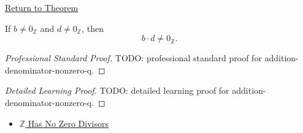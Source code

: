 \newpage
{}
\label{prf:addition-denominator-nonzero-q}

\begin{remark*}[Return]
\hyperref[lem:addition-denominator-nonzero-q]{Return to Theorem}
\end{remark*}

\begin{lemma*}
If $b\ne 0_{\mathbb{Z}}$ and $d\ne 0_{\mathbb{Z}}$, then
\[
b\cdot d\ne 0_{\mathbb{Z}}.
\]
\end{lemma*}

\begin{proof}[Professional Standard Proof]
\LRAProofBodyStart
TODO: professional standard proof for addition-denominator-nonzero-q.
\end{proof}

\begin{proof}[Detailed Learning Proof]
\LRAProofBodyStart
TODO: detailed learning proof for addition-denominator-nonzero-q.
\end{proof}

\begin{remark*}
\end{remark*}

\begin{dependencies}
\begin{itemize}
  \item \hyperref[thm:z-has-no-zero-divisors]{$\mathbb{Z}$ Has No Zero Divisors}
\end{itemize}
\end{dependencies}

\clearpage
